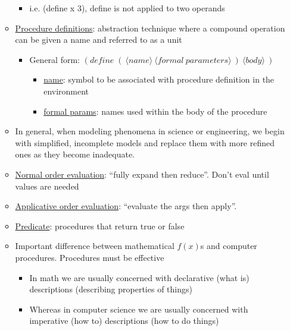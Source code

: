 \documentclass{article}
\begin{document}
\begin{itemize}
\begin{itemize}
    \begin{itemize}
    \item i.e. (define x 3), define is not applied to two operands
    \end{itemize}
  \item \underline{Procedure definitions}: abstraction technique where a compound operation can be given a name and referred to as a unit
    \begin{itemize}
    \item General form: $(define\; (\:\langle name \rangle\: \langle formal\: parameters \rangle\:) \:\langle body \rangle\:)$
      \begin{itemize}
      \item \underline{name}: symbol to be associated with procedure definition in the environment
      \item \underline{formal params}: names used within the body of the procedure
      \end{itemize}
    \end{itemize}
  \item In general, when modeling phenomena in science or engineering, we begin with simplified, incomplete models and replace them with more refined ones as they become inadequate.
  \item \underline{Normal order evaluation}: ``fully expand then reduce''. Don't eval until values are needed
  \item \underline{Applicative order evaluation}: ``evaluate the args then apply''.
  \item \underline{Predicate}: procedures that return true or false
  \item Important difference between mathematical $f(x)$s and computer procedures. Procedures must be effective
    \begin{itemize}
    \item In math we are usually concerned with declarative (what is) descriptions (describing properties of things)
    \item Whereas in computer science we are usually concerned with imperative (how to) descriptions (how to do things)
    \end{itemize}
    \noindent{}
\end{itemize}
\end{itemize}
\end{document}
